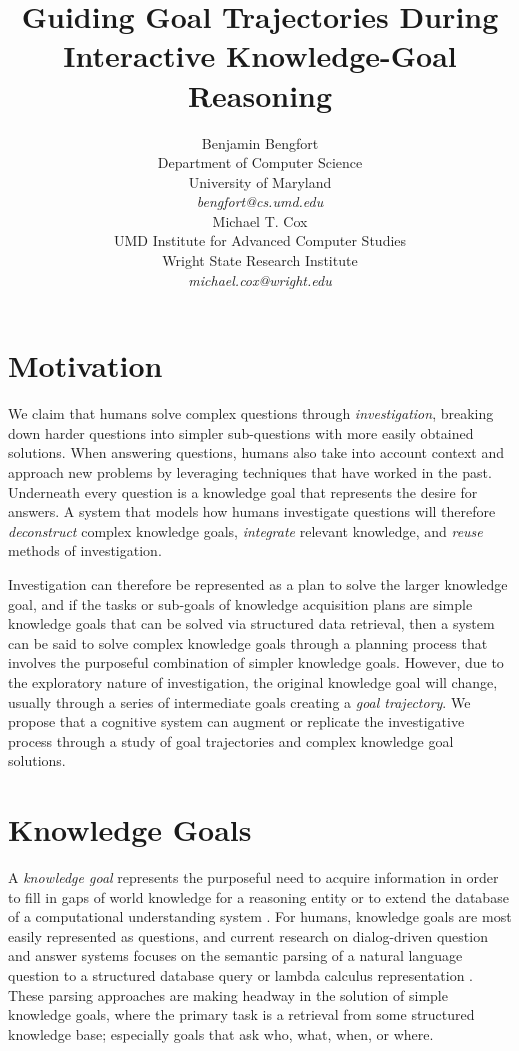 \documentclass[letterpaper]{article}
\title{Guiding Goal Trajectories During Interactive Knowledge-Goal Reasoning}
\author{Benjamin Bengfort\\
Department of Computer Science\\
University of Maryland\\
\textit{bengfort@cs.umd.edu}\\
\And
Michael T. Cox\\
UMD Institute for Advanced Computer Studies\\
Wright State Research Institute\\
\textit{michael.cox@wright.edu}
}
\begin{document}
    \maketitle

\section{Motivation}

We claim that humans solve complex questions through \textit{investigation}, breaking down harder questions into simpler sub-questions with more easily obtained solutions. When answering questions, humans also take into account context and approach new problems by leveraging techniques that have worked in the past. Underneath every question is a knowledge goal that represents the desire for answers. A system that models how humans investigate questions will therefore \textit{deconstruct} complex knowledge goals, \textit{integrate} relevant knowledge, and \textit{reuse} methods of investigation.

Investigation can therefore be represented as a plan to solve the larger knowledge goal, and if the tasks or sub-goals of knowledge acquisition plans are simple knowledge goals that can be solved via structured data retrieval, then a system can be said to solve complex knowledge goals through a planning process that involves the purposeful combination of simpler knowledge goals. However, due to the exploratory nature of investigation, the original knowledge goal will change, usually through a series of intermediate goals creating a \textit{goal trajectory}. We propose that a cognitive system can augment or replicate the investigative process through a study of goal trajectories and complex knowledge goal solutions.


\section{Knowledge Goals}

A \textit{knowledge goal} represents the purposeful need to acquire information in order to fill in gaps of world knowledge for a reasoning entity or to extend the database of a computational understanding system \cite{ram_goal-based_1991}. For humans, knowledge goals are most easily represented as questions, and current research on dialog-driven question and answer systems focuses on the semantic parsing of a natural language question to a structured database query \cite{yahya_natural_2012} or lambda calculus representation \cite{berant_semantic_2013}. These parsing approaches are making headway in the solution of simple knowledge goals, where the primary task is a retrieval from some structured knowledge base; especially goals that ask who, what, when, or where.
\end{document}
